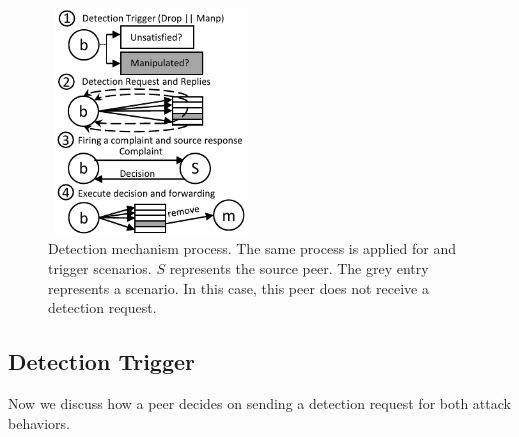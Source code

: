 \begin{figure}
 \centering
 \includegraphics[width=5.5cm,height=6cm]{./Figures/detection.pdf}
  \caption{Detection mechanism process. The same process is applied for \drop and \block trigger scenarios. $S$ represents the source peer. The grey entry represents a \block scenario. In this case, this peer does not receive a detection request.}
\label{detection-blocks} 
\end{figure}

\subsection{Detection Trigger}
\label{Detection-Trigger}
 Now we discuss how a peer decides on sending a detection request for both attack behaviors.
% 

